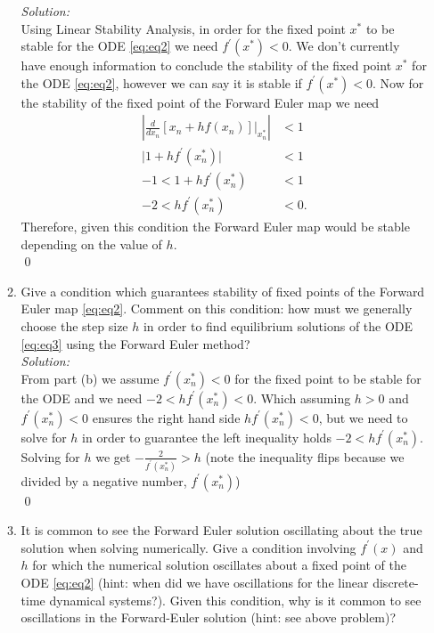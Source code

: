 \documentclass[10pt]{amsart}
\theoremstyle{nonumberplain}
\begin{document}
\begin{enumerate}[label={\bf {\arabic*}:}]
\begin{enumerate}
\textit{Solution:} \\
Using Linear Stability Analysis, in order for the fixed point $x^*$ to be stable for the ODE \eqref{eq:eq2} we need $f^\prime(x^*) < 0$.
We don't currently have enough information to conclude the stability of the fixed point $x^*$ for the ODE \eqref{eq:eq2}, however we can say it is stable if $f^\prime(x^*) < 0$.
Now for the stability of the fixed point of the Forward Euler map we need
\begin{align*}
\left|\frac d{dx_n} \left[x_n + hf(x_n)\right]\Big|_{x_n^*}\right| &< 1 \\
\Big|1 + hf^\prime(x_n^*) \Big| &< 1 \\
-1 < 1 + hf^\prime(x_n^*) &< 1 \\
-2 < hf^\prime(x_n^*) &< 0.
\end{align*}
Therefore, given this condition the Forward Euler map would be stable depending on the value of $h$. \\
\qed \\

\item Give a condition which guarantees stability of fixed points of the Forward Euler map \eqref{eq:eq2}. 
Comment on this condition: how must we generally choose the step size $h$ in order to find equilibrium solutions of the ODE \eqref{eq:eq3} using the Forward Euler method? \\

\textit{Solution:} \\
From part (b) we assume $ f^\prime(x_n^*) < 0$ for the fixed point to be stable for the ODE and we need $-2 < hf^\prime(x_n^*) < 0$.
Which assuming $h > 0$ and $f^\prime(x_n^*) < 0$ ensures the right hand side $hf^\prime(x_n^*) < 0$, but we need to solve for $h$ in order to guarantee the left inequality holds $-2 < hf^\prime(x_n^*)$.
Solving for $h$ we get $- \frac 2 {f^\prime(x_n^*)} > h$ (note the inequality flips because we divided by a negative number, $f^\prime(x_n^*)$) \\
\qed \\

\item It is common to see the Forward Euler solution oscillating about the true solution when solving numerically.
Give a condition involving $f^\prime(x)$ and $h$ for which the numerical solution oscillates about a fixed point of the ODE \eqref{eq:eq2} (hint: when did we have oscillations for the linear discrete-time dynamical systems?).
Given this condition, why is it common to see oscillations in the Forward-Euler solution (hint: see above problem)? \\


\end{enumerate}
\end{enumerate}
\end{document}
